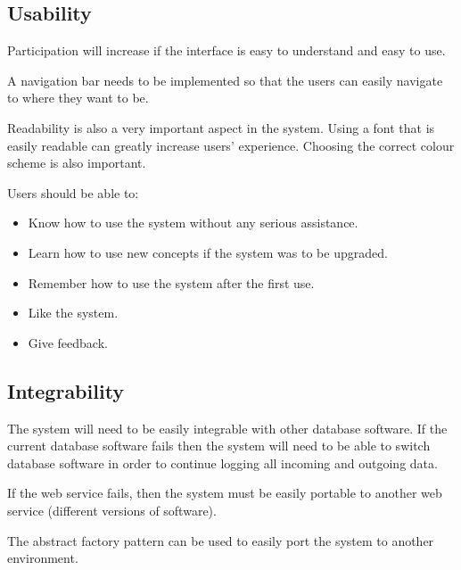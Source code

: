 \subsection{Usability}
\begin{flushleft}
		Participation will increase if the interface is easy to understand and easy to use. \newline
		
		A navigation bar needs to be implemented so that the users can easily navigate to where they want to be. \newline
		
		Readability is also a very important aspect in the system. Using a font that is easily readable can greatly increase users’ experience. Choosing the correct colour scheme is also important. \newline
		
		Users should be able to:
		\begin{itemize}
		\item Know how to use the system without any serious assistance.
		\item Learn how to use new concepts if the system was to be upgraded.
		\item Remember how to use the system after the first use.
		\item Like the system.
		\item Give feedback. 
		\end{itemize}
		

\end{flushleft}

\subsection{Integrability}
\begin{flushleft}
The system will need to be easily integrable with other database software. If the current database software fails then the system will need to be able to switch database software in order to continue logging all incoming and outgoing data. \newline
		
		If the web service fails, then the system must be easily portable to another web service (different versions of software). \newline
		
		The abstract factory pattern can be used to easily port the system to another environment. \newline
\end{flushleft}